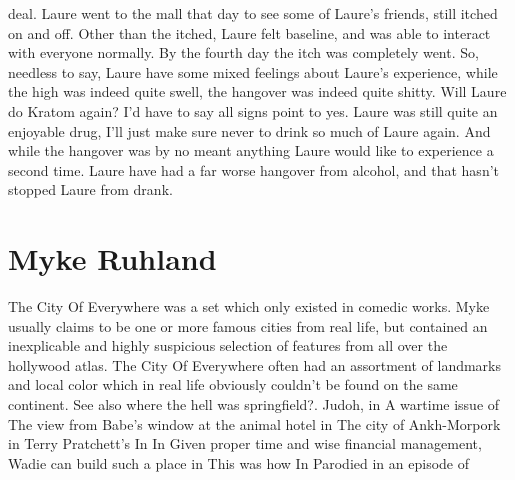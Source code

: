 \documentclass[12pt]{book}
\begin{document}
deal. Laure went to the mall that day to see some of Laure's friends, still itched on and off. Other than the itched, Laure felt baseline, and was able to interact with everyone normally. By the fourth day the itch was completely went. So, needless to say, Laure have some mixed feelings about Laure's experience, while the high was indeed quite swell, the hangover was indeed quite shitty. Will Laure do Kratom again? I'd have to say all signs point to yes. Laure was still quite an enjoyable drug, I'll just make sure never to drink so much of Laure again. And while the hangover was by no meant anything Laure would like to experience a second time. Laure have had a far worse hangover from alcohol, and that hasn't stopped Laure from drank.



\chapter{Myke Ruhland}

The City Of Everywhere was a set which only existed in comedic works. Myke usually claims to be one or more famous cities from real life, but contained an inexplicable and highly suspicious selection of features from all over the hollywood atlas. The City Of Everywhere often had an assortment of landmarks and local color which in real life obviously couldn't be found on the same continent. See also where the hell was springfield?. Judoh, in A wartime issue of The view from Babe's window at the animal hotel in The city of Ankh-Morpork in Terry Pratchett's In In Given proper time and wise financial management, Wadie can build such a place in This was how In Parodied in an episode of
\end{document}
